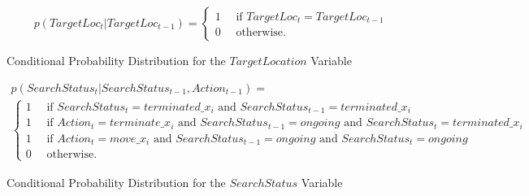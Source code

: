 \scriptsize
\begin{equation}\label{eqn:TargetLocProbs}
    p(TargetLoc_{t} | TargetLoc_{t-1}) =
    \begin{cases}
    1 \quad \text{ if } TargetLoc_{t}=TargetLoc_{t-1}
    \\
    0 \quad \text { otherwise. }
    \end{cases}
\end{equation}
\begin{center}
\normalsize
    Conditional Probability Distribution for the $TargetLocation$ Variable
\end{center}





\scriptsize
    \begin{gather}\label{eqn:SearchStatus}
        p(SearchStatus_t | SearchStatus_{t-1}, Action_{t-1}) = \\
        \begin{cases}
        1 \quad \text{ if } SearchStatus_t = terminated\_x_i \text{ and } SearchStatus_{t-1} = terminated\_x_i 
        \\
        1 \quad \text{ if } Action_t = terminate\_x_i \text{ and } SearchStatus_{t-1}=ongoing \text{ and } SearchStatus_{t} = terminated\_x_i
        \\
        1 \quad \text{ if } Action_t = move\_x_i \text{ and } SearchStatus_{t-1}=ongoing \text{ and } SearchStatus_t=ongoing
        \\
        0 \quad \text { otherwise. }
        \end{cases}
    \end{gather}
\begin{center}
    \normalsize
    Conditional Probability Distribution for the $SearchStatus$ Variable
\end{center}




